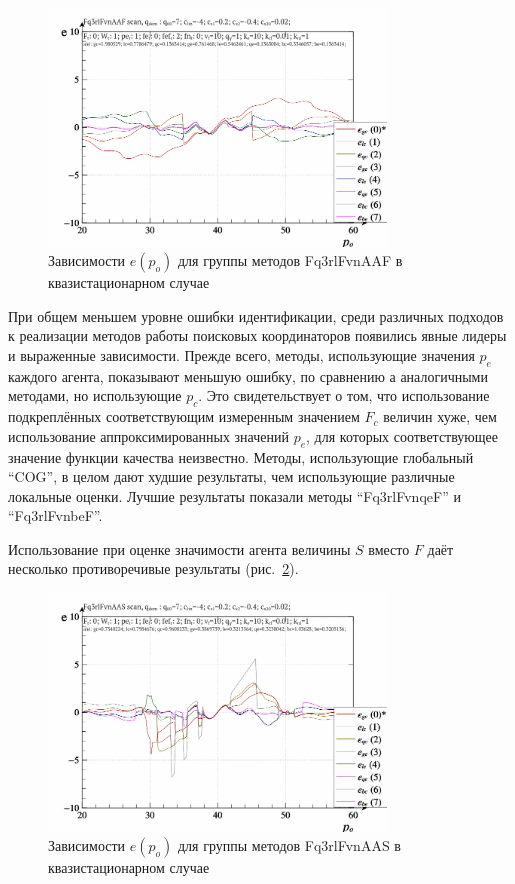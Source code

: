 \begin{figure}[htb!]
  \centerline{
    \includegraphics[width=0.8\textwidth]{p/scan/qls-p_p_e_Fq3rlFvnAAF_scan.png}
  }
  \caption{Зависимости $e(p_o)$ для группы методов Fq3rlFvnAAF в квазистационарном случае}
  \label{atu:f:Fq3rlFvnAAF_scan}
\end{figure}

При общем меньшем уровне ошибки идентификации, среди различных подходов
к реализации методов работы поисковых координаторов появились явные лидеры и
выраженные зависимости. Прежде всего, методы, использующие значения $p_e$
каждого агента, показывают меньшую ошибку, по сравнению а аналогичными методами,
но использующие $p_c$. Это свидетельствует о том, что
использование подкреплённых соответствующим измеренным значением $F_c$ величин
хуже, чем использование аппроксимированных значений $p_e$,
для которых соответствующее значение функции качества неизвестно.
Методы, использующие глобальный ``COG'', в целом
дают худшие результаты, чем использующие различные локальные оценки.
Лучшие результаты показали методы
``Fq3rlFvnqeF'' и ``Fq3rlFvnbeF''.

Использование при оценке значимости агента величины $S$ вместо $F$
даёт несколько противоречивые результаты (рис.~\ref{atu:f:Fq3rlFvnAAS_scan}).

\begin{figure}[htb!]
  \centerline{
    \includegraphics[width=0.8\textwidth]{p/scan/qls-p_p_e_Fq3rlFvnAAS_scan.png}
  }
  \caption{Зависимости $e(p_o)$ для группы методов Fq3rlFvnAAS в квазистационарном случае}
  \label{atu:f:Fq3rlFvnAAS_scan}
\end{figure}


